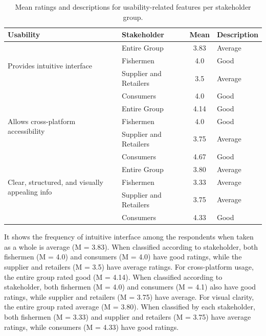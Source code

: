 	\begin{table}[h]
		\centering
		\begin{tabular}{|l|l|c|l|}
			\hline
			\textbf{Usability} & \textbf{Stakeholder} & \textbf{Mean} & \textbf{Description} \\ \hline
			\multirow{3}{*}{Provides intuitive interface} 
			& Entire Group & 3.83 & Average \\ \cline{2-4}
			& Fishermen & 4.0 & Good \\ \cline{2-4}
			& Supplier and Retailers & 3.5 & Average \\ \cline{2-4}
			& Consumers & 4.0 & Good \\ \hline
			
			\multirow{3}{*}{Allows cross-platform accessibility} 
			& Entire Group & 4.14 & Good \\ \cline{2-4}
			& Fishermen & 4.0 & Good \\ \cline{2-4}
			& Supplier and Retailers & 3.75 & Average \\ \cline{2-4}
			& Consumers & 4.67 & Good \\ \hline
			
			\multirow{3}{*}{Clear, structured, and visually appealing info} 
			& Entire Group & 3.80 & Average \\ \cline{2-4}
			& Fishermen & 3.33 & Average \\ \cline{2-4}
			& Supplier and Retailers & 3.75 & Average \\ \cline{2-4}
			& Consumers & 4.33 & Good \\ \hline
			
		\end{tabular}
		\caption{Mean ratings and descriptions for usability-related features per stakeholder group.}
		\label{tab:usability}
	\end{table}
	
	It shows the frequency of intuitive interface among the respondents when taken as a whole is average (M = 3.83). When classified according to stakeholder, both fishermen (M = 4.0) and consumers (M = 4.0) have good ratings, while the supplier and retailers (M = 3.5) have average ratings. For cross-platform usage, the entire group rated good (M = 4.14). When classified according to stakeholder, both fishermen (M = 4.0) and consumers (M = 4.1) also have good ratings, while supplier and retailers (M = 3.75) have average. For visual clarity, the entire group rated average (M = 3.80). When classified by each stakeholder, both fishermen (M = 3.33) and supplier and retailers (M = 3.75) have average ratings, while consumers (M = 4.33)  have good ratings.
	
